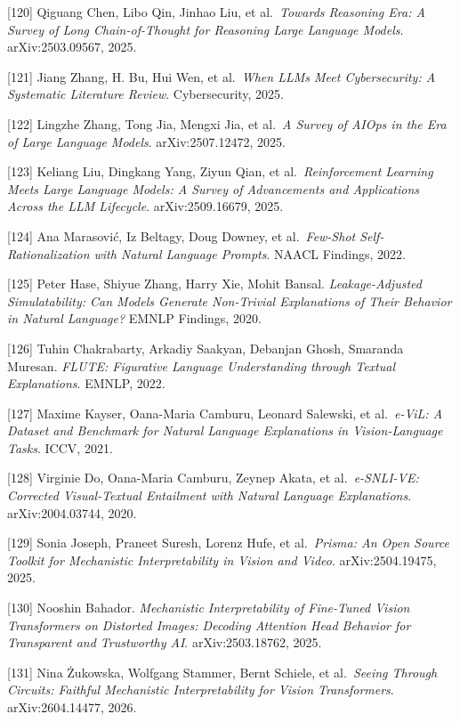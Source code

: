 {[}120{]} Qiguang Chen, Libo Qin, Jinhao Liu, et al.~\emph{Towards Reasoning Era: A Survey of Long Chain-of-Thought for Reasoning Large Language Models}. arXiv:2503.09567, 2025.

{[}121{]} Jiang Zhang, H. Bu, Hui Wen, et al.~\emph{When LLMs Meet Cybersecurity: A Systematic Literature Review}. Cybersecurity, 2025.

{[}122{]} Lingzhe Zhang, Tong Jia, Mengxi Jia, et al.~\emph{A Survey of AIOps in the Era of Large Language Models}. arXiv:2507.12472, 2025.

{[}123{]} Keliang Liu, Dingkang Yang, Ziyun Qian, et al.~\emph{Reinforcement Learning Meets Large Language Models: A Survey of Advancements and Applications Across the LLM Lifecycle}. arXiv:2509.16679, 2025.

{[}124{]} Ana Marasović, Iz Beltagy, Doug Downey, et al.~\emph{Few-Shot Self-Rationalization with Natural Language Prompts}. NAACL Findings, 2022.

{[}125{]} Peter Hase, Shiyue Zhang, Harry Xie, Mohit Bansal. \emph{Leakage-Adjusted Simulatability: Can Models Generate Non-Trivial Explanations of Their Behavior in Natural Language?} EMNLP Findings, 2020.

{[}126{]} Tuhin Chakrabarty, Arkadiy Saakyan, Debanjan Ghosh, Smaranda Muresan. \emph{FLUTE: Figurative Language Understanding through Textual Explanations}. EMNLP, 2022.

{[}127{]} Maxime Kayser, Oana-Maria Camburu, Leonard Salewski, et al.~\emph{e-ViL: A Dataset and Benchmark for Natural Language Explanations in Vision-Language Tasks}. ICCV, 2021.

{[}128{]} Virginie Do, Oana-Maria Camburu, Zeynep Akata, et al.~\emph{e-SNLI-VE: Corrected Visual-Textual Entailment with Natural Language Explanations}. arXiv:2004.03744, 2020.

{[}129{]} Sonia Joseph, Praneet Suresh, Lorenz Hufe, et al.~\emph{Prisma: An Open Source Toolkit for Mechanistic Interpretability in Vision and Video}. arXiv:2504.19475, 2025.

{[}130{]} Nooshin Bahador. \emph{Mechanistic Interpretability of Fine-Tuned Vision Transformers on Distorted Images: Decoding Attention Head Behavior for Transparent and Trustworthy AI}. arXiv:2503.18762, 2025.

{[}131{]} Nina Żukowska, Wolfgang Stammer, Bernt Schiele, et al.~\emph{Seeing Through Circuits: Faithful Mechanistic Interpretability for Vision Transformers}. arXiv:2604.14477, 2026.


